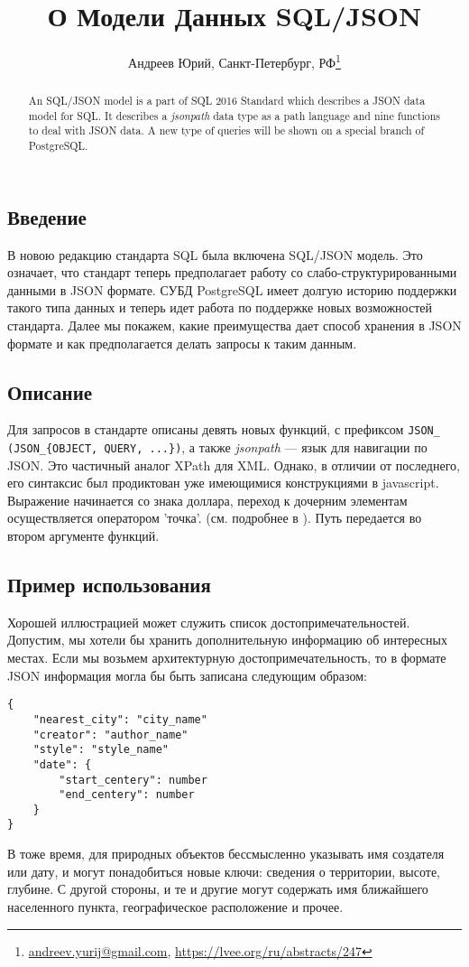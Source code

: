 \documentclass[10pt, a5paper]{article}
\begin{document}
\title{О Модели Данных SQL/JSON}
\author{Андреев Юрий, Санкт-Петербург, РФ\footnote{\url{andreev.yurij@gmail.com}, \url{https://lvee.org/ru/abstracts/247}}}
\maketitle
\begin{abstract}
An SQL/JSON model is a part of SQL 2016 Standard\cite{AY1} which describes a JSON data model for SQL.
It describes a \textit{jsonpath} data type as a path language and nine functions to deal with JSON data.
A new type of queries will be shown on a special branch of PostgreSQL.
\end{abstract}

\subsection*{Введение}
В новою редакцию стандарта SQL\cite{AY1} была включена SQL/JSON модель.
Это означает, что стандарт теперь предполагает работу со слабо-структурированными
данными в JSON формате\cite{AY2}. СУБД PostgreSQL имеет долгую историю поддержки такого типа данных
и теперь идет работа по поддержке новых возможностей \linebreak стандарта\cite{AY4}.
Далее мы покажем, какие преимущества дает способ хранения в JSON формате и как 
предполагается делать запросы к таким данным.

\subsection*{Описание}
Для запросов в стандарте описаны девять новых функций, с префиксом 
\texttt{JSON\_ (JSON\_\{OBJECT, QUERY, ...\})},
а также \textit{jsonpath} --- язык для навигации по JSON. Это частичный аналог XPath для XML. 
Однако, в отличии от последнего, его синтаксис был продиктован уже имеющимися конструкциями в javascript. 
Выражение начинается со знака доллара, переход к дочерним элементам осуществляется оператором 'точка'.
(см. подробнее в \cite{AY3}). Путь передается во втором аргументе функций. 

\subsection*{Пример использования}
Хорошей иллюстрацией может служить список достопримечательностей. 
Допустим, мы хотели бы хранить дополнительную информацию об интересных местах. 
Если мы возьмем архитектурную достопримечательность, 
то в формате JSON информация могла бы быть записана следующим образом:
\begin{verbatim}
{
    "nearest_city": "city_name"
    "creator": "author_name"
    "style": "style_name"
    "date": {
        "start_centery": number
        "end_centery": number
    }
}
\end{verbatim}
В тоже время, для природных объектов бессмысленно указывать имя создателя или дату,
и могут понадобиться новые ключи: сведения о территории, высоте, глубине. 
С другой стороны, и те и другие могут содержать имя ближайшего населенного пункта, 
географическое расположение и прочее. 
\end{document}
